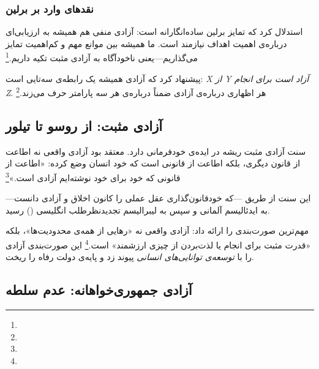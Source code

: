 \subsubsection{نقدهای وارد بر برلین}

 استدلال کرد که تمایز برلین ساده‌انگارانه است: آزادی منفی هم همیشه به ارزیابی‌ای درباره‌ی اهمیت اهداف نیازمند است. ما همیشه بین موانع مهم و کم‌اهمیت تمایز می‌گذاریم—یعنی ناخودآگاه به آزادی مثبت تکیه داریم.\footnote{} %

 پیشنهاد کرد که آزادی همیشه یک رابطه‌ی سه‌تایی است: \textit{X از Y آزاد است برای انجام Z}. هر اظهاری درباره‌ی آزادی ضمناً درباره‌ی هر سه پارامتر حرف می‌زند.\footnote{} %

\subsection{آزادی مثبت: از روسو تا تیلور}
\label{subsec:positive}

سنت آزادی مثبت ریشه در ایده‌ی خودفرمانی دارد.  معتقد بود آزادی واقعی نه اطاعت از قانون دیگری، بلکه اطاعت از قانونی است که خود انسان وضع کرده: «اطاعت از قانونی که خود برای خود نوشته‌ایم آزادی است.»\footnote{} %

این سنت از طریق —که خودقانون‌گذاری عقل عملی را کانون اخلاق و آزادی دانست—به ایدئالیسم آلمانی و سپس به لیبرالیسم تجدیدنظرطلب انگلیسی () رسید.

 مهم‌ترین صورت‌بندی را ارائه داد: آزادی واقعی نه «رهایی از همه‌ی محدودیت‌ها»، بلکه «قدرت مثبت برای انجام یا لذت‌بردن از چیزی ارزشمند» است.\footnote{} این صورت‌بندی آزادی را با \textit{توسعه‌ی توانایی‌های انسانی} پیوند زد و پایه‌ی دولت رفاه را ریخت. %

\subsection{آزادی جمهوری‌خواهانه: عدم سلطه}
\label{subsec:republican}

